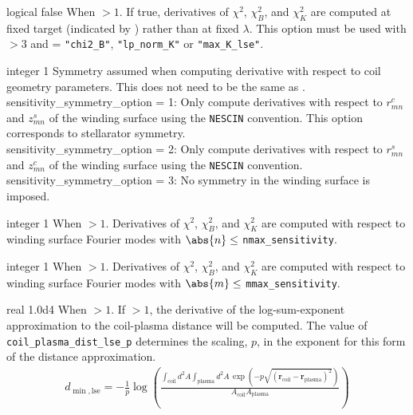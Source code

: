 \myhrule

{logical}
{false}
{When  $> 1$.}
{If true, derivatives of $\chi^2$, $\chi^2_B$, and $\chi^2_K$ are computed at fixed target (indicated by ) rather than at fixed $\lambda$. This option must be used with  $> 3$ and  = \texttt{"chi2\_B"}, \texttt{"lp\_norm\_K"} or \texttt{"max\_K\_lse"}.}

\myhrule

{integer}
{1}
{Symmetry assumed when computing derivative with respect to coil geometry parameters. This does not need to be the same as .}
{\\
{\ttfamily sensitivity\_symmetry\_option = 1}: Only compute derivatives with respect to $r_{mn}^c$ and $z_{mn}^s$ of the winding surface using the \texttt{NESCIN} convention. This option corresponds to stellarator symmetry. \\
{\ttfamily sensitivity\_symmetry\_option = 2}: Only compute derivatives with respect to $r_{mn}^s$ and $z_{mn}^c$ of the winding surface using the \texttt{NESCIN} convention. \\
{\ttfamily sensitivity\_symmetry\_option = 3}: No symmetry in the winding surface is imposed.}

\myhrule

{integer}
{1}
{When  $> 1$.}
{Derivatives of $\chi^2$, $\chi^2_B$, and $\chi^2_K$ are computed with respect to winding surface Fourier modes with $\abs{n} \leq$ \texttt{nmax\_sensitivity}.}

\myhrule

{integer}
{1}
{When  $> 1$.}
{Derivatives of $\chi^2$, $\chi^2_B$, and $\chi^2_K$ are computed with respect to winding surface Fourier modes with $\abs{m} \leq$ \texttt{mmax\_sensitivity}.}

\myhrule

{real}
{1.0d4}
{When $> 1$.}
{If  $> 1$, the derivative of the log-sum-exponent approximation to the coil-plasma distance will be computed. The value of \texttt{coil\_plasma\_dist\_lse\_p} determines the scaling, $p$, in the exponent for this form of the distance approximation.
\begin{gather}
d_{\min,\text{lse}} = - \frac{1}{p} \log \left( \frac{ \int_{\text{coil}} d^2 A \int_{\text{plasma}} d^2 A \, \exp \left( - p \sqrt{ (\bm{r}_{\text{coil}}- \bm{r}_{\text{plasma}})^2} \right)}{A_{\text{coil}} A_{\text{plasma}}} \right)
\end{gather}
 }

\myhrule

